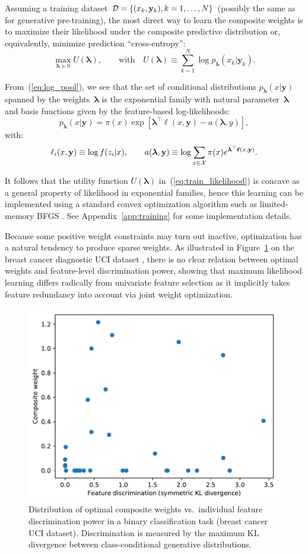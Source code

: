 \documentclass[english]{scrartcl}
\def\y{{\mathbf{y}}}
\newcommand{\blambda}{{\boldsymbol{\lambda}}}
\newcommand{\bell}{{\boldsymbol{\ell}}}
\begin{document}
Assuming a training dataset ${\cal D}=\{(x_k,\y_k), k=1,\ldots,N\}$ (possibly the same as for generative pre-training), the most direct way to learn the composite weights is to maximize their likelihood under the composite predictive distribution or, equivalently, minimize prediction ``cross-entropy'':
\begin{equation}
\label{eq:train_likelihood}
\max_{\blambda\succeq 0} U(\blambda),
\qquad \text{with} \quad
U(\blambda) \equiv\sum_{k=1}^N \log p_\blambda(x_k|\y_k).
\end{equation}

From~(\ref{eq:log_pool}), we see that the set of conditional distributions $p_\blambda(x|\y)$ spanned by the weights~$\blambda$ is the exponential family with natural parameter~$\blambda$ and basis functions given by the feature-based log-likelihoods:
$$
p_\blambda(x|\y) = \pi(x) \exp[\blambda^\top \bell(x,\y) - a(\blambda,y)],
$$
with:
$$
\ell_i(x,\y) \equiv \log f(z_i|x),
\qquad
a(\blambda, \y) \equiv \log \sum_{x\in{\cal X}} \pi(x) e^{\blambda^\top \bell(x,\y)}.
$$

It follows that the utility function $U(\blambda)$ in~(\ref{eq:train_likelihood}) is concave as a general property of likelihood in exponential families, hence this learning can be implemented using a standard convex optimization algorithm such as limited-memory BFGS \cite{Byrd-95}. See Appendix~\ref{app:training} for some implementation details. 

Because some positive weight constraints may turn out inactive, optimization has a natural tendency to produce sparse weights. As illustrated in Figure~\ref{fig:disc_weight_plot} on the breast cancer diagnostic UCI dataset \cite{Wolberg-94}, there is no clear relation between optimal weights and feature-level discrimination power, showing that maximum likelihood learning differs radically from univariate feature selection as it implicitly takes feature redundancy into account via joint weight optimization.

\begin{figure}[!ht]
  \begin{center}
    \includegraphics[width=.6\textwidth]{disc_weight_plot.pdf}
  \end{center}
\caption{Distribution of optimal composite weights vs.~individual feature discrimination power in a binary classification task (breast cancer UCI dataset). Discrimination is measured by the maximum KL divergence between class-conditional generative distributions.}
\label{fig:disc_weight_plot}
\end{figure}
\end{document}
